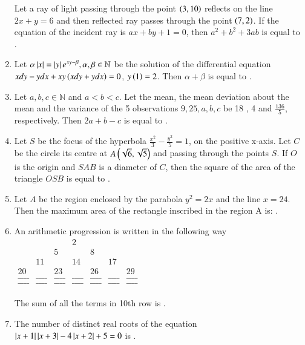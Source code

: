 \documentclass[journal]{IEEEtran}
\begin{document}
\begin{enumerate}[start=16]
Let a ray of light passing through the point $\left(3,10\right)$ reflects on the line $2x+y=6$ and then reflected ray passes through the point $\left(7,2\right)$. If the equation of the incident ray is $ax+by+1=0$, then $a^2+b^2+3ab$ is equal to \underline{\hspace{1cm}}.
\item %
Let $\alpha \left\vert x\right\vert = \left\vert y\right\vert e^{xy - \beta}, \alpha , \beta \in \mathbb{N} $ be the solution of the differential equation $xdy-ydx+xy\left(xdy+ydx\right) = 0$, $y\left(1\right) = 2 $. Then $\alpha + \beta $ is equal to \underline{\hspace{1cm}}.
\item %
Let $a,b,c \in \mathbb{N}$ and $a<b<c$. Let the mean, the mean deviation about the mean and the variance of the 5 observations $9,25,a,b,c$ be 18 , 4 and $\frac{136}{5}$, respectively. Then $2a+b-c$ is equal to \underline{\hspace{1cm}}.
\item %
Let $S$ be the focus of the hyperbola $\frac{x^2}{3} - \frac{y^2}{5} = 1$, on the positive x-axis. Let $C$ be the circle its centre at $A\left(\sqrt{6},\sqrt{5}\right)$ and passing through the points $S$. If $O$ is the origin and $SAB$ is a diameter of $C$, then the square of the area of the triangle $OSB$ is equal to \underline{\hspace{1cm}}. 
\item %
Let $A$ be the region enclosed by the parabola $y^2 = 2x$ and the line $x=24$. Then the maximum area of the rectangle inscribed in the region A is: \underline{\hspace{1cm}}.
\item %
An arithmetic progression is written in the following way 
$
\begin{array}{ccccccc}
& & & 2\\
& & 5 & & 8 & & \\
& 11 &  & 14 & & 17 & \\
20 & & 23 & & 26 & & 29  \\
\_ \_ \_ \_ & \_ \_ \_ \_ & \_ \_ \_ \_ & \_ \_ \_ \_ & \_ \_ \_ \_ & \_ \_ \_ \_ & \_ \_ \_ \_ \\
\_ \_ \_ \_ & \_ \_ \_ \_ & \_ \_ \_ \_ & \_ \_ \_ \_ & \_ \_ \_ \_ & \_ \_ \_ \_ & \_ \_ \_ \_ 
\end{array}
$\\
\\
The sum of all the terms in 10th row is \underline{\hspace{1cm}}.
\item %
The number of distinct real roots of the equation $\left\vert x + 1\right\vert \left\vert x + 3\right\vert - 4\left\vert x + 2\right\vert + 5 = 0$ is \underline{\hspace{1cm}}.

\end{enumerate}
\end{document}
